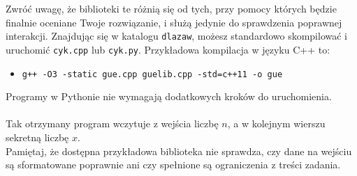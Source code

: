\documentclass[zad,zawodnik,utf8]{sinol}
\begin{document}
\begin{tasktext}
    \noindent Zwróć uwagę, że biblioteki te różnią się od tych,
    przy pomocy których będzie finalnie oceniane Twoje
    rozwiązanie, i służą jedynie do sprawdzenia poprawnej interakcji.
    Znajdując się w katalogu \texttt{dlazaw}, możesz
    standardowo skompilować i uruchomić \texttt{cyk.cpp} lub \texttt{cyk.py}.
    Przykładowa kompilacja w języku C++ to:

    \begin{itemize}
        \item \texttt{g++ -O3 -static gue.cpp guelib.cpp -std=c++11 -o gue}
    \end{itemize}
    
    \noindent Programy w Pythonie nie wymagają dodatkowych kroków do uruchomienia.\\
    \\
    Tak otrzymany program wczytuje z wejścia liczbę $n$,
    a w kolejnym wierszu sekretną liczbę $x$.
    \\
    Pamiętaj, że dostępna przykładowa biblioteka nie sprawdza,
    czy dane na wejściu są sformatowane poprawnie
    ani czy spełnione są ograniczenia z treści zadania.

\end{tasktext}
\end{document}
